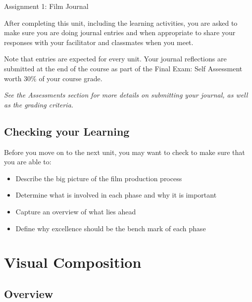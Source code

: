 \documentclass[
]{book}
\providecommand{\tightlist}{%
  \setlength{\itemsep}{0pt}\setlength{\parskip}{0pt}}
\begin{document}
\begin{assessment}
{Assignment 1: Film Journal}

After completing this unit, including the learning activities, you are asked to make sure you are doing journal entries and when appropriate to share your responses with your facilitator and classmates when you meet.

Note that entries are expected for every unit. Your journal reflections are submitted at the end of the course as part of the Final Exam: Self Assessment worth 30\% of your course grade.

\emph{See the Assessments section for more details on submitting your journal, as well as the grading criteria.}
\end{assessment}

\hypertarget{checking-your-learning-1}{%
\section*{Checking your Learning}\label{checking-your-learning-1}}

\begin{progress}
Before you move on to the next unit, you may want to check to make sure that you are able to:

\begin{itemize}
\tightlist
\item
  Describe the big picture of the film production process\\
\item
  Determine what is involved in each phase and why it is important\\
\item
  Capture an overview of what lies ahead\\
\item
  Define why excellence should be the bench mark of each phase
\end{itemize}
\end{progress}

\hypertarget{visual-composition}{%
\chapter{Visual Composition}\label{visual-composition}}

\hypertarget{overview-2}{%
\section*{Overview}\label{overview-2}}
\end{document}
